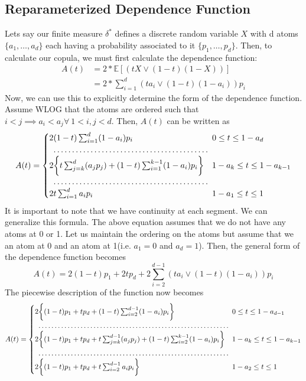\documentclass[12pt]{article}
\def\E{\mathbb{E}}
\newcommand{\ds}{\displaystyle}
\theoremstyle{definition}
\theoremstyle{definition}
\begin{document}
\subsection{Reparameterized Dependence Function}
Lets say our finite measure $\delta^*$ defines a discrete random variable $X$ with d atoms $\{a_1, \hdots, a_d\}$ each having a probability associated to it $\{p_1, \hdots, p_d\}$. Then, to calculate our copula, we must first calculate the dependence function:
\begin{align*}
    A(t)&=2* \E[(tX\vee (1-t)(1-X))]\\
    &=2*\sum_{i=1}^d(ta_i\vee (1-t)(1-a_i))p_i
\end{align*}
Now, we can use this to explicitly determine the form of the dependence function. Assume WLOG that the atoms are ordered such that $i<j \implies a_i<a_j \forall \ 1<i,j<d$. Then, $A(t)$ can be written as 
\begin{align*}
    A(t)=\begin{cases}
    2 (1-t)\sum_{i=1}^d(1-a_i)p_i & 0\leq t\leq 1-a_d\\
    \hdotsfor{1}\\
    2\bigg\{t\sum_{j=k}^d(a_jp_j)+(1-t)\sum_{i=1}^{k-1}(1-a_i)p_i\bigg\}& 1-a_k\leq t\leq 1-a_{k-1}\\
    \hdotsfor{1}\\
    2t\sum_{i=1}^da_ip_i& 1-a_1\leq t\leq 1
    \end{cases}
\end{align*}
It is important to note that we have continuity at each segment. 
We can generalize this formula. The above equation assumes that we do not have any atoms at 0 or 1. Let us maintain the ordering on the atoms but  assume that we an atom at 0 and an atom at 1(i.e. $a_1=0$ and $a_d=1$). Then, the general form of the dependence function becomes
$$\ds A(t)=2(1-t)p_1 + 2tp_d+2\sum_{i=2}^{d-1}(ta_i\vee (1-t)(1-a_i))p_i$$
The piecewise description of the function now becomes
\begin{align*}
    A(t)=\begin{cases}
    2\bigg\{(1-t)p_1 + tp_d+  (1-t)\sum_{i=2}^{d-1}(1-a_i)p_i \bigg\}& 0\leq t\leq 1-a_{d-1}\\
    \hdotsfor{1}\\
    2\bigg\{(1-t)p_1 + tp_d+ t\sum_{j=k}^{d-1}(a_jp_j)+(1-t)\sum_{i=2}^{k-1}(1-a_i)p_i\bigg\}& 1-a_k\leq t\leq 1-a_{k-1}\\
    \hdotsfor{1}\\
     2\bigg\{(1-t)p_1 + tp_d+t\sum_{i=2}^{d-1}a_ip_i\bigg\}& 1-a_2\leq t\leq 1
    \end{cases}
\end{align*}
\end{document}

